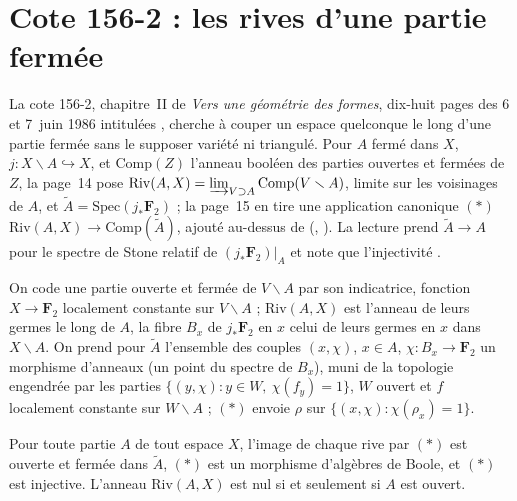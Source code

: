 \section[Cote 156-2 : les rives d'une partie fermée]{Cote 156-2 : les rives d'une partie fermée\protect{}}\label{sec:156-2}

La cote 156-2, chapitre~II de \emph{Vers une géométrie des formes}, dix-huit pages des 6 et 7~juin 1986 intitulées , cherche à couper un espace quelconque le long d'une partie fermée sans le supposer variété ni triangulé. Pour $A$ fermé dans $X$, $j : X \smallsetminus A \hookrightarrow X$, et $\mathrm{Comp}(Z)$ l'anneau booléen des parties ouvertes et fermées de $Z$, la page~14 pose $\mathrm{Riv}(A, X) = \varinjlim_{V \supset A} \mathrm{Comp}(V \smallsetminus A)$, limite sur les voisinages de $A$, et $\widetilde A = \mathrm{Spec}(j_*\mathbf F_2)$ ; la page~15 en tire une application canonique $(*)$ $\mathrm{Riv}(A, X) \to \mathrm{Comp}(\widetilde A)$,  ajouté au-dessus de  (, ). La lecture prend $\widetilde A \to A$ pour le spectre de Stone relatif de $(j_*\mathbf F_2)|_A$ et note que l'injectivité .

On code une partie ouverte et fermée de $V \smallsetminus A$ par son indicatrice, fonction $X \to \mathbf F_2$ localement constante sur $V \smallsetminus A$ ; $\mathrm{Riv}(A, X)$ est l'anneau de leurs germes le long de $A$, la fibre $B_x$ de $j_*\mathbf F_2$ en $x$ celui de leurs germes en $x$ dans $X \smallsetminus A$. On prend pour $\widetilde A$ l'ensemble des couples $(x, \chi)$, $x \in A$, $\chi : B_x \to \mathbf F_2$ un morphisme d'anneaux (un point du spectre de $B_x$), muni de la topologie engendrée par les parties $\{(y, \chi) : y \in W,\ \chi(f_y) = 1\}$, $W$ ouvert et $f$ localement constante sur $W \smallsetminus A$ ; $(*)$ envoie $\rho$ sur $\{(x, \chi) : \chi(\rho_x) = 1\}$.

\begin{encadre}
\begin{theoreme}
Pour toute partie $A$ de tout espace $X$, l'image de chaque rive par $(*)$ est ouverte et fermée dans $\widetilde A$, $(*)$ est un morphisme d'algèbres de Boole, et $(*)$ est injective. L'anneau $\mathrm{Riv}(A, X)$ est nul si et seulement si $A$ est ouvert.
\end{theoreme}
\end{encadre}

